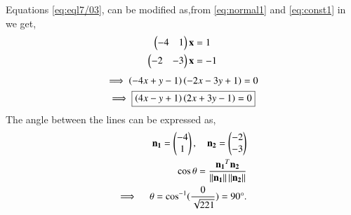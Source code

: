 \documentclass[journal,12pt,twocolumn]{IEEEtran}
\begin{document}
Equations \eqref{eq:eql7/03}, can be modified as,from \eqref{eq:normal1} and \eqref{eq:const1} in we get,
\begin{align}
    \begin{pmatrix}-4 & 1\end{pmatrix}\mathbf{x}&=1\\
    \begin{pmatrix}-2 & -3\end{pmatrix}\mathbf{x}&=-1
\end{align}
\begin{multline}
\implies \left(-4x+y-1\right)\left(-2x-3y+1\right)= 0\\
\implies \boxed{\left(4x-y+1\right)\left(2x+3y-1\right) = 0} \label{eq:line1}
\end{multline}
The angle between the lines can be expressed as, 
\begin{align}
	\mathbf{n_1}=\begin{pmatrix}-4\\1\end{pmatrix} , \quad \mathbf{n_2}=\begin{pmatrix}-2\\-3\end{pmatrix}\\
	\cos\theta=\frac{\mathbf{n_1}^T\mathbf{n_2}}{\left\lVert\mathbf{n_1}\right\rVert\left\lVert\mathbf{n_2}\right\rVert} \\
	\implies \quad \theta=\cos^{-1}({\frac{0}{\sqrt{221}}}) = 90\degree.
\end{align}
\end{document}
